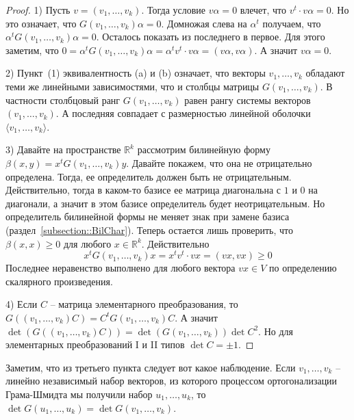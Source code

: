\begin{proof}
1) Пусть $v = (v_1,\ldots,v_k)$.
Тогда условие $v\alpha = 0$ влечет, что $v^t \cdot v\alpha = 0$.
Но это означает, что $G(v_1,\ldots,v_k) \alpha = 0$.
Домножая слева на $\alpha^t$ получаем, что $\alpha^t G(v_1,\ldots,v_k) \alpha = 0$.
Осталось показать из последнего в первое.
Для этого заметим, что $0 = \alpha^t G(v_1,\ldots,v_k) \alpha = \alpha^t v^t \cdot v\alpha = (v\alpha, v\alpha)$.
А значит $v\alpha = 0$.

2) Пункт~(1) эквивалентность (a) и (b) означает, что векторы $v_1,\ldots,v_k$ обладают теми же линейными зависимостями, что и столбцы матрицы $G(v_1,\ldots,v_k)$.
В частности столбцовый ранг $G(v_1,\ldots,v_k)$ равен рангу системы векторов $(v_1,\ldots,v_k)$.
А последняя совпадает с размерностью линейной оболочки $\langle v_1,\ldots,v_k\rangle$.

3) Давайте на пространстве $\mathbb R^k$ рассмотрим билинейную форму $\beta(x,y) = x^t G(v_1,\ldots,v_k)y$.
Давайте покажем, что она не отрицательно определена.
Тогда, ее определитель должен быть не отрицательным.
Действительно, тогда в каком-то базисе ее матрица диагональна с $1$ и $0$ на диагонали, а значит в этом базисе определитель будет неотрицательным.
Но определитель билинейной формы не меняет знак при замене базиса (раздел~\ref{subsection::BilChar}).
Теперь остается лишь проверить, что $\beta(x,x)\geqslant 0$ для любого $x\in \mathbb R^k$.
Действительно
\[
x^t G(v_1,\ldots,v_k) x = x^t v^t\cdot v x = (vx, vx) \geqslant 0
\]
Последнее неравенство выполнено для любого вектора $vx\in V$ по определению скалярного произведения.

4) Если $C$ -- матрица элементарного преобразования, то $G((v_1,\ldots,v_k)C) = C^t G(v_1,\ldots,v_k)C$.
А значит $\det(G((v_1,\ldots,v_k)C)) = \det(G(v_1,\ldots,v_k))\det C^2$.
Но для элементарных преобразований I и II типов $\det C = \pm 1$.
\end{proof}

Заметим, что из третьего пункта следует вот какое наблюдение.
Если $v_1,\ldots, v_k$ -- линейно независимый набор векторов, из которого процессом ортогонализации Грама-Шмидта мы получили набор $u_1,\ldots,u_k$, то $\det G(u_1,\ldots,u_k) = \det G(v_1,\ldots,v_k)$.
